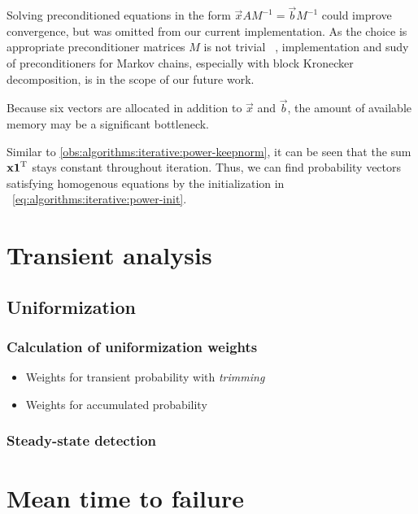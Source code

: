 Solving preconditioned equations in the form
$\vec{x} A M^{-1} = \vec{b} M^{-1}$ could improve convergence, but was
omitted from our current implementation. As the choice is appropriate
preconditioner matrices $M$ is not trivial%
~\citep{DBLP:journals/informs/LangvilleS04}, implementation and sudy
of preconditioners for Markov chains, especially with block Kronecker
decomposition, is in the scope of our future work.

Because six vectors are allocated in addition to $\vec{x}$ and
$\vec{b}$, the amount of available memory may be a significant
bottleneck. 

Similar to \vref{obs:algorithms:iterative:power-keepnorm}, it can be
seen that the sum $\bm{\mathrm{x}} \bm{\mathrm{1}}^{\mathrm{T}}$ stays constant throughout
 iteration. Thus, we can find probability vectors
satisfying homogenous equations by the initialization in%
~\cref{eq:algorithms:iterative:power-init}.

\section{Transient analysis}

\subsection{Uniformization}

\subsubsection{Calculation of uniformization weights}

\begin{itemize}
\item Weights for transient probability with \emph{trimming}
\item Weights for accumulated probability
\end{itemize}

\subsubsection{Steady-state detection}

\subsection{}

\section{Mean time to failure}

